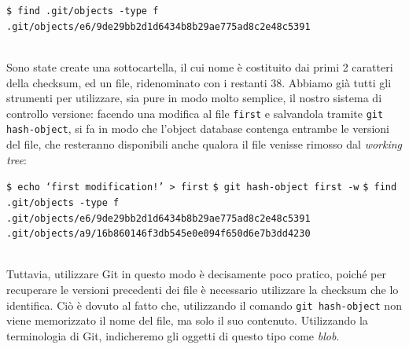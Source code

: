 \documentclass[12pt]{article}
\def\code#1{\texttt{#1}}
\def\minquote#1{`#1'}
\begin{document}
\begin{algorithm*}
	\begin{algorithmic}
		\State \code{\$ find .git/objects -type f}
		\State \code{.git/objects/e6/9de29bb2d1d6434b8b29ae775ad8c2e48c5391}	
	\end{algorithmic}
\end{algorithm*}
\ \\
Sono state create una sottocartella, il cui nome è costituito dai primi 2 caratteri della checksum, ed un file, ridenominato con i restanti 38.
Abbiamo già tutti gli strumenti per utilizzare, sia pure in modo molto semplice, il nostro sistema di controllo versione: facendo una modifica al file \code{first} e salvandola tramite \code{git hash-object}, si fa in modo che l'object database contenga entrambe le versioni del file, che resteranno disponibili anche qualora il file venisse rimosso dal \textit{working tree}:
\begin{algorithm*}
	\begin{algorithmic}
		\State \code{\$ echo \minquote{first modification!} > first}
		\State \code{\$ git hash-object first -w}	
		\State \code{\$ find .git/objects -type f}
		\State \code{.git/objects/e6/9de29bb2d1d6434b8b29ae775ad8c2e48c5391}
		\State \code{.git/objects/a9/16b860146f3db545e0e094f650d6e7b3dd4230}
	\end{algorithmic}
\end{algorithm*}
\ \\Tuttavia, utilizzare Git in questo modo è decisamente poco pratico, poiché per recuperare le versioni precedenti dei file è necessario utilizzare la checksum che lo identifica. Ciò è dovuto al fatto che, utilizzando il comando \code{git hash-object} non viene memorizzato il nome del file, ma solo il suo contenuto. Utilizzando la terminologia di Git, indicheremo gli oggetti di questo tipo come \textit{blob}.
\end{document}
